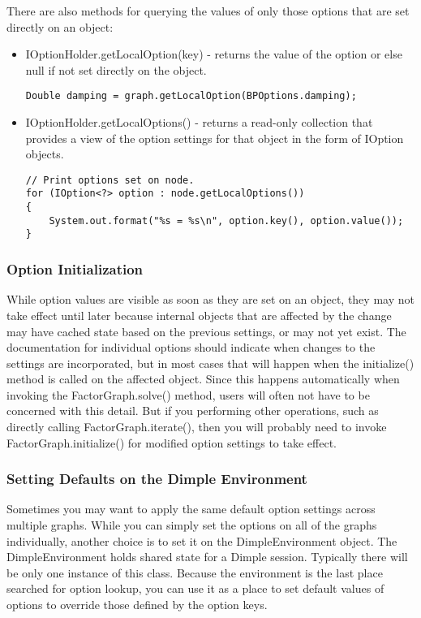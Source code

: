 There are also methods for querying the values of only those options that are set directly on an object:

\begin{itemize}
\item IOptionHolder.getLocalOption(key) - returns the value of the option or else null if not set directly on the object.
\begin{lstlisting}
Double damping = graph.getLocalOption(BPOptions.damping);
\end{lstlisting}

\item IOptionHolder.getLocalOptions() - returns a read-only collection that provides a view of the option settings for that object in the form of IOption objects.
\begin{lstlisting}
// Print options set on node.
for (IOption<?> option : node.getLocalOptions())
{
    System.out.format("%s = %s\n", option.key(), option.value());
}
\end{lstlisting}
\end{itemize}

\fi %

\subsubsection{Option Initialization}

While option values are visible as soon as they are set on an object, they may not take effect until later because internal objects that are affected by the change may have cached state based on the previous settings, or may not yet exist. The documentation for individual options should indicate when changes to the settings are incorporated, but in most cases that will happen when the initialize() method is called on the affected object. Since this happens automatically when invoking the FactorGraph.solve() method, users will often not have to be concerned with this detail. But if you performing other operations, such as directly calling FactorGraph.iterate(), then you will probably need to invoke FactorGraph.initialize() for modified option settings to take effect.

\subsubsection{Setting Defaults on the Dimple Environment}

Sometimes you may want to apply the same default option settings across multiple graphs. While you can simply set the options on all of the graphs individually, another choice is to set it on the DimpleEnvironment object. The DimpleEnvironment holds shared state for a Dimple session. Typically there will be only one instance of this class. Because the environment is the last place searched for option lookup, you can use it as a place to set default values of options to override those defined by the option keys.

